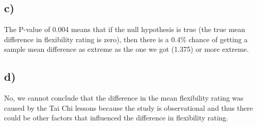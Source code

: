 \documentclass{article}
\begin{document}
\subsection*{c)}
The P-value of 0.004 means that if the null hypothesis is true (the true mean difference in flexibility rating is zero),
then there is a 0.4\% chance of getting a sample mean difference as extreme as the one we got (1.375) or more extreme.

\subsection*{d)}
No, we cannot conclude that the difference in the mean flexibility rating was caused by the Tai Chi lessons because
the study is observational and thus there could be other factors that influenced the difference in flexibility rating.
\end{document}
